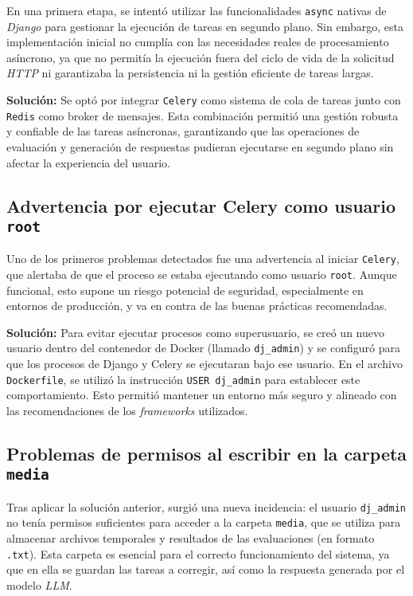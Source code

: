 En una primera etapa, se intentó utilizar las funcionalidades \texttt{async} nativas de \textit{Django} para gestionar la ejecución de tareas en segundo plano. Sin embargo, esta implementación inicial no cumplía con las necesidades reales de procesamiento asíncrono, ya que no permitía la ejecución fuera del ciclo de vida de la solicitud \textit{HTTP} ni garantizaba la persistencia ni la gestión eficiente de tareas largas.

\textbf{Solución:} Se optó por integrar \texttt{Celery} como sistema de cola de tareas junto con \texttt{Redis} como broker de mensajes. Esta combinación permitió una gestión robusta y confiable de las tareas asíncronas, garantizando que las operaciones de evaluación y generación de respuestas pudieran ejecutarse en segundo plano sin afectar la experiencia del usuario.

\subsection*{Advertencia por ejecutar Celery como usuario \texttt{root}}

Uno de los primeros problemas detectados fue una advertencia al iniciar \texttt{Celery}, que alertaba de que el proceso se estaba ejecutando como usuario \texttt{root}. Aunque funcional, esto supone un riesgo potencial de seguridad, especialmente en entornos de producción, y va en contra de las buenas prácticas recomendadas.

\textbf{Solución:} Para evitar ejecutar procesos como superusuario, se creó un nuevo usuario dentro del contenedor de Docker (llamado \texttt{dj\_admin}) y se configuró para que los procesos de Django y Celery se ejecutaran bajo ese usuario. En el archivo \texttt{Dockerfile}, se utilizó la instrucción \texttt{USER dj\_admin} para establecer este comportamiento. Esto permitió mantener un entorno más seguro y alineado con las recomendaciones de los \textit{frameworks} utilizados.

\subsection*{Problemas de permisos al escribir en la carpeta \texttt{media}}

Tras aplicar la solución anterior, surgió una nueva incidencia: el usuario \texttt{dj\_admin} no tenía permisos suficientes para acceder a la carpeta \texttt{media}, que se utiliza para almacenar archivos temporales y resultados de las evaluaciones (en formato \texttt{.txt}). Esta carpeta es esencial para el correcto funcionamiento del sistema, ya que en ella se guardan las tareas a corregir, así como la respuesta generada por el modelo \textit{LLM}.


